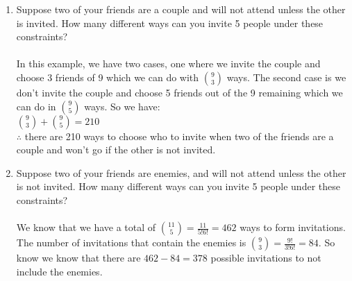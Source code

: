 \documentclass[12pt]{article}
\begin{document}
\begin{enumerate}
\begin{enumerate}
	\item Suppose two of your friends are a couple and will not attend unless the other is invited. How many different ways can you invite 5 people under these constraints?\\
    \\In this example, we have two cases, one where we invite the couple and choose 3 friends of 9 which we can do with $\binom{9}{3}$ ways. The second case is we don't invite the couple and choose 5 friends out of the 9 remaining which we can do in $\binom{9}{5}$ ways. So we have:
    \\$\binom{9}{3} + \binom{9}{5} = 210$
    \\$\therefore$ there are 210 ways to choose who to invite when two of the friends are a couple and won't go if the other is not invited.

	\item Suppose two of your friends are enemies, and will not attend unless the other is not invited. How many different ways can you invite 5 people under these constraints?\\
    \\We know that we have a total of $\binom{11}{5} = \frac{11}{5!6!} = 462$ ways to form invitations. The number of invitations that contain the enemies is $\binom{9}{3} = \frac{9!}{3!6!} = 84$. So know we know that there are $462 - 84 = 378$ possible invitations to not include the enemies.
\end{enumerate}



\end{enumerate}
\end{document}
